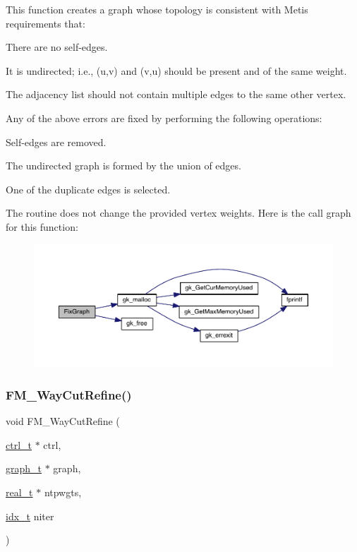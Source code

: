 This function creates a graph whose topology is consistent with Metis\textquotesingle{} requirements that\+:
\begin{DoxyItemize}
\item There are no self-\/edges.
\item It is undirected; i.\+e., (u,v) and (v,u) should be present and of the same weight.
\item The adjacency list should not contain multiple edges to the same other vertex.
\end{DoxyItemize}

Any of the above errors are fixed by performing the following operations\+:
\begin{DoxyItemize}
\item Self-\/edges are removed.
\item The undirected graph is formed by the union of edges.
\item One of the duplicate edges is selected.
\end{DoxyItemize}

The routine does not change the provided vertex weights. Here is the call graph for this function\+:\nopagebreak
\begin{figure}[H]
\begin{center}
\leavevmode
\includegraphics[width=350pt]{a00945_a681b2f4a615da39347c928c127760d07_cgraph}
\end{center}
\end{figure}
\mbox{\label{a00945_a1c215aad2804a5cba2e54e93113bc0d5}} 
\subsubsection{\texorpdfstring{F\+M\+\_\+Way\+Cut\+Refine()}{FM\_2WayCutRefine()}}
{\footnotesize\ttfamily void F\+M\+\_\+Way\+Cut\+Refine (\begin{DoxyParamCaption}\item[{\hyperlink{a00742}{ctrl\+\_\+t} $\ast$}]{ctrl,  }\item[{\hyperlink{a00734}{graph\+\_\+t} $\ast$}]{graph,  }\item[{\hyperlink{a00876_a1924a4f6907cc3833213aba1f07fcbe9}{real\+\_\+t} $\ast$}]{ntpwgts,  }\item[{\hyperlink{a00876_aaa5262be3e700770163401acb0150f52}{idx\+\_\+t}}]{niter }\end{DoxyParamCaption})}

